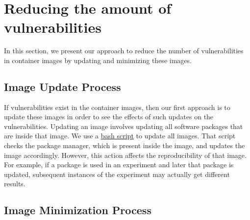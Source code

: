 \documentclass[a4paper,num-refs]{oup-contemporary}
\begin{document}
\section{Reducing the amount of vulnerabilities}

In this section, we present our approach to reduce the number of
vulnerabilities in container images  by updating and minimizing these
images.
\vspace*{-2mm}
\subsection{Image Update Process}

If vulnerabilities exist in the container images, then our first approach
is to update these images in order to see the effects of such updates
on the vulnerabilities.
Updating an image involves updating all software packages that are
inside that image. We use a 
\href{https://github.com/kaurbhupinder/Vulnerability-Analysis/blob/master/Scripts/update/update.sh}{bash script} 
to update all images. That script checks the
package manager, which is present inside the image, and updates the image
accordingly. However, this action affects the reproducibility
of that image. For example, if a package is used in an experiment
and later that package is updated, subsequent instances of the experiment may actually
get different results.
\vspace*{-2mm}
\subsection{Image Minimization Process}
\end{document}
